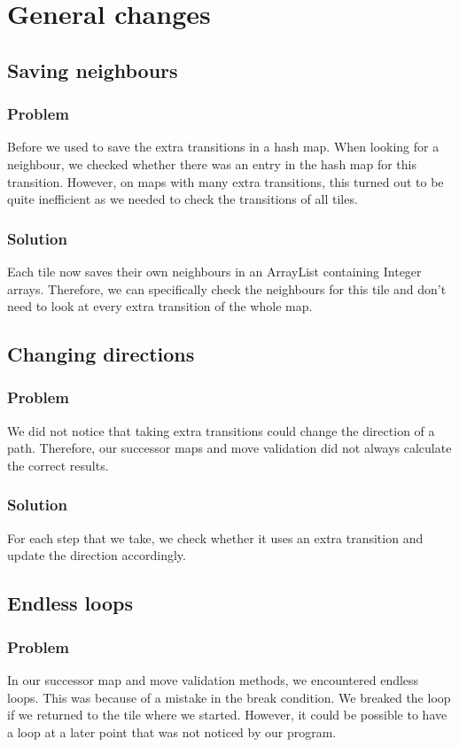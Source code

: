 \section{General changes}
\subsection{Saving neighbours}
\subsubsection{Problem}
Before we used to save the extra transitions in a hash map. When looking for a neighbour, we checked whether there was an entry in the hash map for this transition. However, on maps with many extra transitions, this turned out to be quite inefficient as we needed to check the transitions of all tiles.
\subsubsection{Solution}
Each tile now saves their own neighbours in an ArrayList containing Integer arrays. Therefore, we can specifically check the neighbours for this tile and don't need to look at every extra transition of the whole map.

\subsection{Changing directions}
\subsubsection{Problem}
We did not notice that taking extra transitions could change the direction of a path. Therefore, our successor maps and move validation did not always calculate the correct results.
\subsubsection{Solution}
For each step that we take, we check whether it uses an extra transition and update the direction accordingly.

\subsection{Endless loops}
\subsubsection{Problem}
In our successor map and move validation methods, we encountered endless loops. This was because of a mistake in the break condition. We breaked the loop if we returned to the tile where we started. However, it could be possible to have a loop at a later point that was not noticed by our program.
